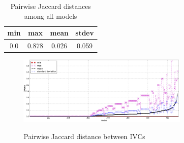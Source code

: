 \begin{table}
  \centering
  \begin{tabular}{ |c|c|c|c| }
    \hline
     min & max & mean & stdev \\[0.5ex]
    \hline
     0.0   & 0.878 & 0.026 & 0.059 \\[0.5ex]
    \hline
  \end{tabular}
  \caption{Pairwise Jaccard distances among all models}
  \label{tab:jaccard-avg}
\end{table}

\begin{figure}
  \centering
  \includegraphics[width=0.75\textwidth]{figs/jacdis2.png} \\
  \vspace{-0.1in}
  \caption{Pairwise Jaccard distance between IVCs}\label{fig:jacdis}
\end{figure}

